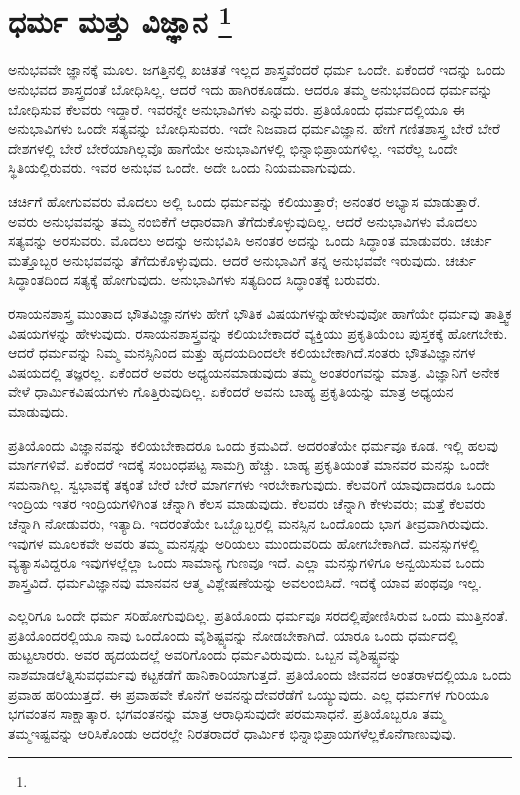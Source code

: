 
\chapter[ಧರ್ಮ ಮತ್ತು ವಿಜ್ಞಾನ ]{ಧರ್ಮ ಮತ್ತು ವಿಜ್ಞಾನ \protect\footnote{}}

ಅನುಭವವೇ ಜ್ಞಾನಕ್ಕೆ ಮೂಲ. ಜಗತ್ತಿನಲ್ಲಿ ಖಚಿತತೆ ಇಲ್ಲದ ಶಾಸ್ತ್ರವೆಂದರೆ ಧರ್ಮ ಒಂದೇ. ಏಕೆಂದರೆ ಇದನ್ನು ಒಂದು ಅನುಭವದ ಶಾಸ್ತ್ರದಂತೆ ಬೋಧಿಸಿಲ್ಲ. ಆದರೆ ಇದು ಹಾಗಿರಕೂಡದು. ಆದರೂ ತಮ್ಮ ಅನುಭವದಿಂದ ಧರ್ಮವನ್ನು ಬೋಧಿಸುವ ಕೆಲವರು ಇದ್ದಾರೆ. ಇವರನ್ನೇ ಅನುಭಾವಿಗಳು ಎನ್ನುವರು. ಪ್ರತಿಯೊಂದು ಧರ್ಮದಲ್ಲಿಯೂ ಈ ಅನುಭಾವಿಗಳು ಒಂದೇ ಸತ್ಯವನ್ನು ಬೋಧಿಸುವರು. ಇದೇ ನಿಜವಾದ ಧರ್ಮವಿಜ್ಞಾನ. ಹೇಗೆ ಗಣಿತಶಾಸ್ತ್ರ ಬೇರೆ ಬೇರೆ ದೇಶಗಳಲ್ಲಿ ಬೇರೆ ಬೇರೆಯಾಗಿಲ್ಲವೊ ಹಾಗೆಯೇ ಅನುಭಾವಿಗಳಲ್ಲಿ ಭಿನ್ನಾಭಿಪ್ರಾಯಗಳಿಲ್ಲ. ಇವರೆಲ್ಲ ಒಂದೇ ಸ್ಥಿತಿಯಲ್ಲಿರುವರು. ಇವರ ಅನುಭವ ಒಂದೇ. ಅದೇ ಒಂದು ನಿಯಮವಾಗುವುದು.

ಚರ್ಚಿಗೆ ಹೋಗುವವರು ಮೊದಲು ಅಲ್ಲಿ ಒಂದು ಧರ್ಮವನ್ನು ಕಲಿಯುತ್ತಾರೆ; ಅನಂತರ ಅಭ್ಯಾಸ ಮಾಡುತ್ತಾರೆ. ಅವರು ಅನುಭವವನ್ನು ತಮ್ಮ ನಂಬಿಕೆಗೆ ಆಧಾರವಾಗಿ ತೆಗೆದುಕೊಳ್ಳುವುದಿಲ್ಲ. ಆದರೆ ಅನುಭಾವಿಗಳು ಮೊದಲು ಸತ್ಯವನ್ನು ಅರಸುವರು. ಮೊದಲು ಅದನ್ನು ಅನುಭವಿಸಿ ಅನಂತರ ಅದನ್ನು ಒಂದು ಸಿದ್ಧಾಂತ ಮಾಡುವರು. ಚರ್ಚು ಮತ್ತೊಬ್ಬರ ಅನುಭವವನ್ನು ತೆಗೆದುಕೊಳ್ಳುವುದು. ಆದರೆ ಅನುಭಾವಿಗೆ ತನ್ನ ಅನುಭವವೇ ಇರುವುದು. ಚರ್ಚು ಸಿದ್ಧಾಂತದಿಂದ ಸತ್ಯಕ್ಕೆ ಹೋಗುವುದು. ಅನುಭಾವಿಗಳು ಸತ್ಯದಿಂದ ಸಿದ್ಧಾಂತಕ್ಕೆ ಬರುವರು.

ರಸಾಯನಶಾಸ್ತ್ರ ಮುಂತಾದ ಭೌತವಿಜ್ಞಾನಗಳು ಹೇಗೆ ಭೌತಿಕ ವಿಷಯಗಳನ್ನು\break ಹೇಳುವುವೋ ಹಾಗೆಯೇ ಧರ್ಮವು ತಾತ್ತ್ವಿಕ ವಿಷಯಗಳನ್ನು ಹೇಳುವುದು. ರಸಾಯನಶಾಸ್ತ್ರವನ್ನು ಕಲಿಯಬೇಕಾದರೆ ವ್ಯಕ್ತಿಯು ಪ್ರಕೃತಿಯೆಂಬ ಪುಸ್ತಕಕ್ಕೆ ಹೋಗಬೇಕು. ಆದರೆ ಧರ್ಮವನ್ನು ನಿಮ್ಮ ಮನಸ್ಸಿನಿಂದ ಮತ್ತು ಹೃದಯದಿಂದಲೇ ಕಲಿಯಬೇಕಾಗಿದೆ.\break ಸಂತರು ಭೌತವಿಜ್ಞಾನಗಳ ವಿಷಯದಲ್ಲಿ ತಜ್ಞರಲ್ಲ. ಏಕೆಂದರೆ ಅವರು ಅಧ್ಯಯನ\break ಮಾಡುವುದು ತಮ್ಮ ಅಂತರಂಗವನ್ನು ಮಾತ್ರ. ವಿಜ್ಞಾನಿಗೆ ಅನೇಕ ವೇಳೆ ಧಾರ್ಮಿಕ\break ವಿಷಯಗಳು ಗೊತ್ತಿರುವುದಿಲ್ಲ. ಏಕೆಂದರೆ ಅವನು ಬಾಹ್ಯ ಪ್ರಕೃತಿಯನ್ನು ಮಾತ್ರ ಅಧ್ಯಯನ ಮಾಡುವುದು.

ಪ್ರತಿಯೊಂದು ವಿಜ್ಞಾನವನ್ನು ಕಲಿಯಬೇಕಾದರೂ ಒಂದು ಕ್ರಮವಿದೆ. ಅದರಂತೆಯೇ ಧರ್ಮವೂ ಕೂಡ. ಇಲ್ಲಿ ಹಲವು ಮಾರ್ಗಗಳಿವೆ. ಏಕೆಂದರೆ ಇದಕ್ಕೆ ಸಂಬಂಧಪಟ್ಟ ಸಾಮಗ್ರಿ ಹೆಚ್ಚು. ಬಾಹ್ಯ ಪ್ರಕೃತಿಯಂತೆ ಮಾನವರ ಮನಸ್ಸು ಒಂದೇ ಸಮನಾಗಿಲ್ಲ. ಸ್ವಭಾವಕ್ಕೆ ತಕ್ಕಂತೆ ಬೇರೆ ಬೇರೆ ಮಾರ್ಗಗಳು ಇರಬೇಕಾಗುವುದು. ಕೆಲವರಿಗೆ ಯಾವುದಾದರೂ ಒಂದು ಇಂದ್ರಿಯ ಇತರ ಇಂದ್ರಿಯಗಳಿಗಿಂತ ಚೆನ್ನಾಗಿ ಕೆಲಸ ಮಾಡುವುದು. ಕೆಲವರು ಚೆನ್ನಾಗಿ ಕೇಳುವರು; ಮತ್ತೆ ಕೆಲವರು ಚೆನ್ನಾಗಿ ನೋಡುವರು, ಇತ್ಯಾದಿ. ಇದರಂತೆಯೇ ಒಬ್ಬೊಬ್ಬರಲ್ಲಿ ಮನಸ್ಸಿನ ಒಂದೊಂದು ಭಾಗ ತೀವ್ರವಾಗಿರುವುದು. ಇವುಗಳ ಮೂಲಕವೇ ಅವರು ತಮ್ಮ ಮನಸ್ಸನ್ನು ಅರಿಯಲು ಮುಂದುವರಿದು ಹೋಗಬೇಕಾಗಿದೆ. ಮನಸ್ಸುಗಳಲ್ಲಿ ವ್ಯತ್ಯಾಸವಿದ್ದರೂ ಇವುಗಳಲ್ಲೆಲ್ಲಾ ಒಂದು ಸಾಮಾನ್ಯ ಗುಣವೂ ಇದೆ. ಎಲ್ಲಾ ಮನಸ್ಸುಗಳಿಗೂ ಅನ್ವಯಿಸುವ ಒಂದು ಶಾಸ್ತ್ರವಿದೆ. ಧರ್ಮವಿಜ್ಞಾನವು ಮಾನವನ ಆತ್ಮ ವಿಶ್ಲೇಷಣೆಯನ್ನು ಅವಲಂಬಿಸಿದೆ. ಇದಕ್ಕೆ ಯಾವ ಪಂಥವೂ ಇಲ್ಲ.

\eject

ಎಲ್ಲರಿಗೂ ಒಂದೇ ಧರ್ಮ ಸರಿಹೋಗುವುದಿಲ್ಲ. ಪ್ರತಿಯೊಂದು ಧರ್ಮವೂ ಸರದಲ್ಲಿ\break ಪೋಣಿಸಿರುವ ಒಂದು ಮುತ್ತಿನಂತೆ. ಪ್ರತಿಯೊಂದರಲ್ಲಿಯೂ ನಾವು ಒಂದೊಂದು ವೈಶಿಷ್ಟ್ಯವನ್ನು ನೋಡಬೇಕಾಗಿದೆ. ಯಾರೂ ಒಂದು ಧರ್ಮದಲ್ಲಿ ಹುಟ್ಟಲಾರರು. ಅವರ ಹೃದಯದಲ್ಲೆ ಅವರಿಗೊಂದು ಧರ್ಮವಿರುವುದು. ಒಬ್ಬನ ವೈಶಿಷ್ಟ್ಯವನ್ನು ನಾಶಮಾಡಲೆತ್ನಿಸುವ\break ಧರ್ಮವು ಕಟ್ಟಕಡೆಗೆ ಹಾನಿಕಾರಿಯಾಗುತ್ತದೆ. ಪ್ರತಿಯೊಂದು ಜೀವನದ ಅಂತರಾಳ\break ದಲ್ಲಿಯೂ ಒಂದು ಪ್ರವಾಹ ಹರಿಯುತ್ತದೆ. ಈ ಪ್ರವಾಹವೇ ಕೊನೆಗೆ ಅವನನ್ನು\break ದೇವರೆಡೆಗೆ ಒಯ್ಯುವುದು. ಎಲ್ಲ ಧರ್ಮಗಳ ಗುರಿಯೂ ಭಗವಂತನ ಸಾಕ್ಷಾತ್ಕಾರ. ಭಗವಂತನನ್ನು ಮಾತ್ರ ಆರಾಧಿಸುವುದೇ ಪರಮಸಾಧನೆ. ಪ್ರತಿಯೊಬ್ಬರೂ ತಮ್ಮ ತಮ್ಮ\break ಇಷ್ಟವನ್ನು ಆರಿಸಿಕೊಂಡು ಅದರಲ್ಲೇ ನಿರತರಾದರೆ ಧಾರ್ಮಿಕ ಭಿನ್ನಾಭಿಪ್ರಾಯಗಳೆಲ್ಲ\break ಕೊನೆಗಾಣುವುವು.


